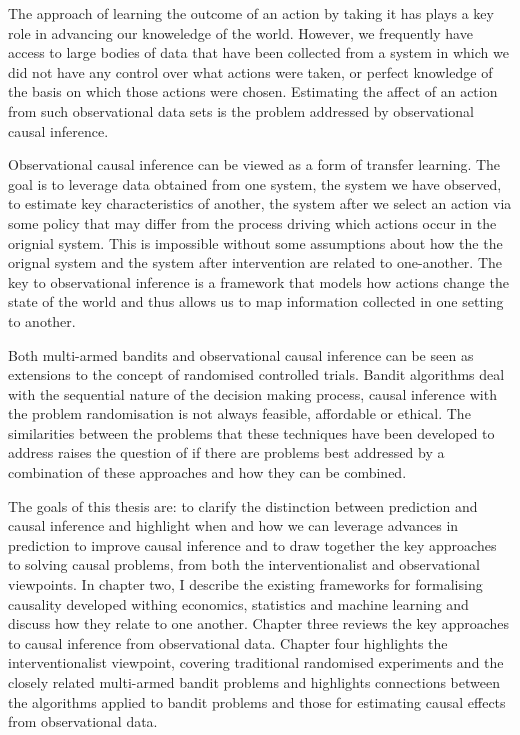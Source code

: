 \documentclass[11pt,a4paper,oneside]{book}
\theoremstyle{plain}
\theoremstyle{definition}
\begin{document}
The approach of learning the outcome of an action by taking it has plays a key role in advancing our knoweledge of the world. However, we frequently have access to large bodies of data that have been collected from a system in which we did not have any control over what actions were taken, or perfect knowledge of the basis on which those actions were chosen. Estimating the affect of an action from such observational data sets is the problem addressed by observational causal inference. 

Observational causal inference can be viewed as a form of transfer learning. The goal is to leverage data obtained from one system, the system we have observed, to estimate key characteristics of another, the system after we select an action via some policy that may differ from the process driving which actions occur in the orignial system. This is impossible without some assumptions about how the the orignal system and the system after intervention are related to one-another. The key to observational inference is a framework that models how actions change the state of the world and thus allows us to map information collected in one setting to another. 

Both multi-armed bandits and observational causal inference can be seen as extensions to the concept of randomised controlled trials. Bandit algorithms deal with the sequential nature of the decision making process, causal inference with the problem randomisation is not always feasible, affordable or ethical. The similarities between the problems that these techniques have been developed to address raises the question of if there are problems best addressed by a combination of these approaches and how they can be combined. 

The goals of this thesis are: to clarify the distinction between prediction and causal inference and highlight when and how we can leverage advances in prediction to improve causal inference and to draw together the key approaches to solving causal problems, from both the interventionalist and observational viewpoints. In chapter two, I describe the existing frameworks for formalising causality developed withing economics, statistics and machine learning and discuss how they relate to one another. Chapter three reviews the key approaches to causal inference from observational data. Chapter four highlights the interventionalist viewpoint, covering traditional randomised experiments and the closely related multi-armed bandit problems and highlights connections between the algorithms applied to bandit problems and those for estimating causal effects from observational data. 
\end{document}
